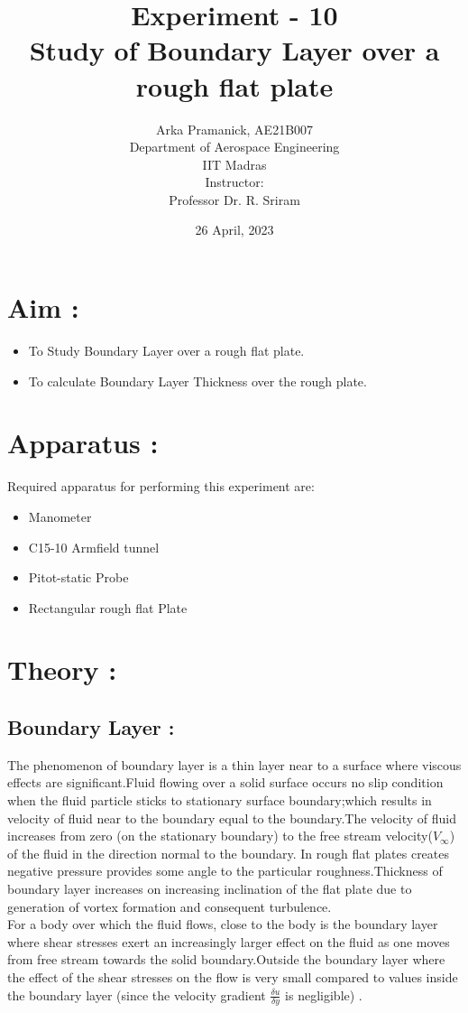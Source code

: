\documentclass[12pt,a4paper]{article}
\title{{Experiment - 10\\ \textbf{ Study of Boundary Layer over a rough flat plate}}}
\author{Arka Pramanick, AE21B007\\ Department of Aerospace Engineering\\ IIT Madras\\[3ex] Instructor:\\ \large Professor Dr. R. Sriram}
\date{26 April, 2023}
\begin{document}
\maketitle

\hline

\section{Aim :}
\begin{itemize}
    \item To Study Boundary Layer over a rough flat plate.
    \item To calculate Boundary Layer Thickness over the rough plate.
\end{itemize}


\section{Apparatus :}
Required apparatus for performing this experiment are:
\begin{itemize}
    \item Manometer
    \item C15-10 Armfield tunnel
    \item Pitot-static Probe
    \item Rectangular rough flat Plate
\end{itemize}



\newpage
\section{Theory :}

\subsection{Boundary Layer :} The phenomenon of boundary layer is a thin layer near to a surface where viscous effects are significant.Fluid flowing over a solid surface occurs no slip condition when the fluid particle sticks to stationary surface boundary;which results in  velocity of fluid near to the boundary equal to the boundary.The velocity of fluid increases from zero (on the stationary 
boundary) to the free stream velocity($V_{\infty}$) of the fluid in the direction normal to the boundary. In rough flat plates creates negative pressure provides some angle to the particular roughness.Thickness of boundary layer increases on increasing inclination of the flat plate due to generation of vortex formation and consequent turbulence.\\
For a body over which the fluid flows, close to the body is the boundary layer where shear stresses exert an increasingly larger effect on the fluid as one moves from free stream towards the solid boundary.Outside the boundary layer where the effect of the shear stresses on the flow is very small compared to values inside the boundary layer (since the velocity gradient $ \frac{\delta u}{\delta y} $ is negligible) .
\end{document}
